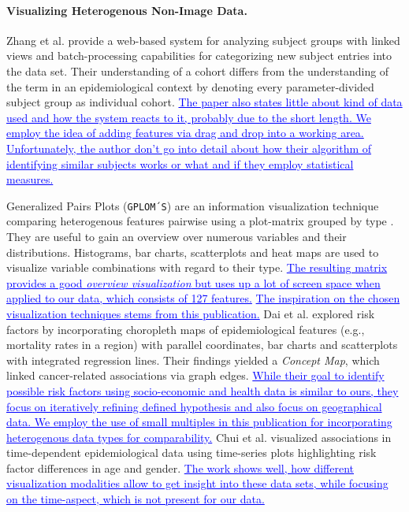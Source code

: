 \documentclass[journal]{style/vgtc} 			          %
\newcommand{\add}[1]{\textcolor{blue}{\uline{#1}}}
\begin{document}
\paragraph{Visualizing Heterogenous Non-Image Data.}
Zhang et al. \cite{Zhang2012} provide a web-based system for analyzing subject groups with linked views and batch-processing capabilities for categorizing new subject entries into the data set.
%
Their understanding of a cohort differs from the understanding of the term in an epidemiological context by denoting every parameter-divided subject group as individual cohort.
%
\add{The paper also states little about kind of data used and how the system reacts to it, probably due to the short length.
%
We employ the idea of adding features via drag and drop into a working area.
%
Unfortunately, the author don't go into detail about how their algorithm of identifying similar subjects works or what and if they employ statistical measures.}

Generalized Pairs Plots (\texttt{GPLOM´S}) are an information visualization technique comparing heterogenous features pairwise using a plot-matrix grouped by type \cite{GPLOMS, Francois2013}.
%
They are useful to gain an overview over numerous variables and their distributions.
%
Histograms, bar charts, scatterplots and heat maps are used to visualize variable combinations with regard to their type.
%
\add{The resulting matrix provides a good \emph{overview visualization} but uses up a lot of screen space when applied to our data, which consists of 127 features.}
%
%
%
\add{The inspiration on the chosen visualization techniques stems from this publication.}
%
Dai et al. \cite{Dai2005} explored risk factors by incorporating choropleth maps of epidemiological features (e.g., mortality rates in a region) with parallel coordinates, bar charts and scatterplots with integrated regression lines.
%
Their findings yielded a \emph{Concept Map}, which linked cancer-related associations via graph edges.
%
\add{While their goal to identify possible risk factors using socio-economic and health data is similar to ours, they focus on iteratively refining defined hypothesis and also focus on geographical data.
%
We employ the use of small multiples in this publication for incorporating heterogenous data types for comparability.}
%
Chui et al. \cite{Chui2011} visualized associations in time-dependent epidemiological data using time-series plots highlighting risk factor differences in age and gender.
%
\add{The work shows well, how different visualization modalities allow to get insight into these data sets, while focusing on the time-aspect, which is not present for our data.}
\end{document}
